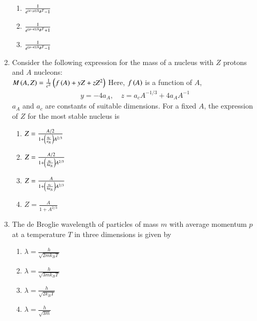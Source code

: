 \documentclass[journal]{IEEEtran}
\numberwithin{equation}{enumi}
\numberwithin{figure}{enumi}
\begin{document}
\begin{enumerate}[start=25]
\begin{enumerate}
        \item $\frac{1}{e^{\left(\varepsilon - \mu\right) / k_B T} - 1}$
        \item $\frac{1}{e^{\left(\mu - \varepsilon\right) / k_B T} + 1}$
        \item $\frac{1}{e^{\left(\mu - \varepsilon\right) / k_B T} - 1}$
    \end{enumerate}
    \item Consider the following expression for the mass of a nucleus with $Z$ protons and $A$ nucleons:\\
    $
    M\left(A, Z\right) = \frac{1}{c^2} \left(f\left(A\right) + yZ + zZ^2\right)
    $
    Here, $f\left(A\right)$ is a function of $A$,
    \begin{align*}
    y = -4a_A, \quad z = a_c A^{-1/3} + 4a_A A^{-1}
    \end{align*}
    $a_A$ and $a_c$ are constants of suitable dimensions. For a fixed $A$, the expression of $Z$ for the most stable nucleus is
    \begin{enumerate}
        \item $Z = \frac{A / 2}{1 + \left(\frac{a_c}{a_A}\right) A^{2/3}}$
        \item $Z = \frac{A / 2}{1 + \left(\frac{a_c}{4a_A}\right) A^{2/3}}$
        \item $Z = \frac{A}{1 + \left(\frac{a_c}{4a_A}\right) A^{2/3}}$
        \item $Z = \frac{A}{1 + A^{2/3}}$
    \end{enumerate}
    \item The de Broglie wavelength of particles of mass $m$ with average momentum $p$ at a temperature $T$ in three dimensions is given by
    \begin{enumerate}
        \item $\lambda = \frac{h}{\sqrt{2mk_B T}}$
        \item $\lambda = \frac{h}{\sqrt{3mk_B T}}$
        \item $\lambda = \frac{h}{\sqrt{2k_B T}}$
        \item $\lambda = \frac{h}{\sqrt{3m}}$
    \end{enumerate}
\end{enumerate}
\end{document}
